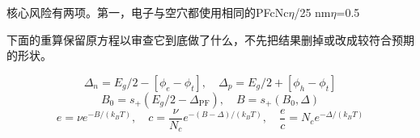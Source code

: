 \par
{\cjkfont 核心风险有两项。第一，电子与空穴都使用相同的}\allowbreak{}PF\allowbreak{}cNc\ensuremath{\eta}/2\allowbreak{}5 nm\allowbreak{}\ensuremath{\eta}=\allowbreak{}0.5\allowbreak{}
\par
{\cjkfont 下面的重算保留原方程以审查它到底做了什么，不先把结果删掉或改成较符合预期的形状。}\allowbreak{}
\par
\begin{equation}
\Delta_n=E_g/2-[\phi_e-\phi_t],\quad\Delta_p=E_g/2+[\phi_h-\phi_t]
\label{eq:24}\end{equation}
\begin{equation}
B_0=s_+(E_g/2-\Delta_{\mathrm{PF}}),\quad B=s_+(B_0,\Delta)
\label{eq:25}\end{equation}
\begin{equation}
e=\nu e^{-B/(k_BT)},\quad c=\frac{\nu}{N_c}e^{-(B-\Delta)/(k_BT)},\quad\frac{e}{c}=N_c e^{-\Delta/(k_BT)}
\label{eq:26}\end{equation}

